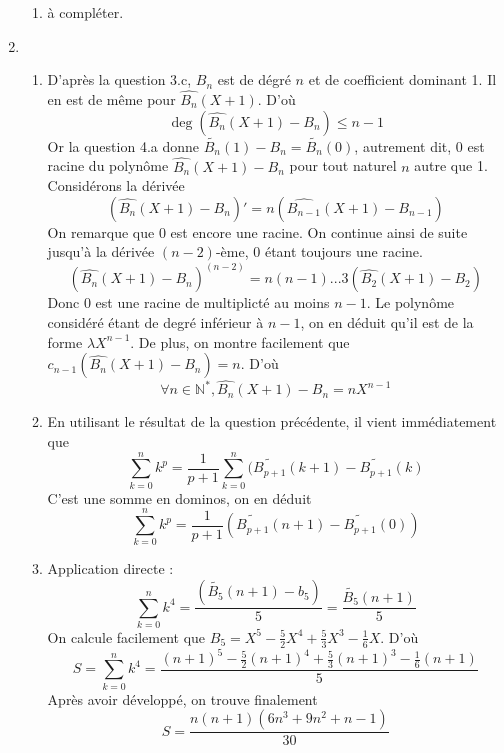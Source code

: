 \begin{enumerate}
\begin{enumerate}
\item à compléter.
\end{enumerate}
	
\item
\begin{enumerate}
\item D'après la question 3.c, $B_n$ est de dégré $n$ et de coefficient dominant 1. Il en est de même pour $\widehat{B_n}(X+1)$. D'où 
		\[\deg (\widehat{B_n}(X+1)-B_n)\leq n-1\]
Or la question 4.a donne $\widetilde{B_n}(1)-B_n=\widetilde{B_n}(0)$, autrement dit, 0 est racine du polynôme $\widehat{B_n}(X+1)-B_n$ pour tout naturel $n$ autre que 1.\newline 
Considérons la dérivée
		\[(\widehat{B_n}(X+1)-B_n)'=n(\widehat{B_{n-1}}(X+1)-B_{n-1})\]
On remarque que 0 est encore une racine. On continue ainsi de suite jusqu'à la dérivée $(n-2)$-ème, 0 étant toujours une racine.
		\[(\widehat{B_n}(X+1)-B_n)^{(n-2)}=n(n-1)...3(\widehat{B_{2}}(X+1)-B_{2})\]
Donc $0$ est une racine de multiplicté au moins $n-1$. Le polynôme considéré étant de degré inférieur à $n-1$, on en déduit qu'il est de la forme $\lambda X^{n-1}$. De plus, on montre facilement que $c_{n-1}(\widehat{B_n}(X+1)-B_n)=n$. D'où
		\[\forall n \in \mathbb{N}^{*}, \widehat{B_{n}}(X+1)-B_n=nX^{n-1}\]
		
\item En utilisant le résultat de la question précédente, il vient immédiatement que 
		\[\sum_{k=0}^nk^p=\frac{1}{p+1}\sum_{k=0}^n(\widetilde{B_{p+1}}(k+1)-\widetilde{B_{p+1}}(k)\]
C'est une somme en dominos, on en déduit
		\[\sum_{k=0}^nk^p=\frac{1}{p+1}(\widetilde{B_{p+1}}(n+1)-\widetilde{B_{p+1}}(0))\]
		
\item Application directe :
		\[\sum_{k=0}^nk^4=\frac{(\widetilde{B_{5}}(n+1)-b_5)}{5}=\frac{\widetilde{B_{5}}(n+1)}{5}\]
On calcule facilement que $B_5=X^5-\frac{5}{2}X^4+\frac{5}{3}X^3-\frac{1}{6}X$. D'où
		\[S=\sum_{k=0}^nk^4=\frac{(n+1)^5-\frac{5}{2}(n+1)^4+\frac{5}{3}(n+1)^3-\frac{1}{6}(n+1)}{5}\]
Après avoir développé, on trouve finalement
		\[S=\frac{n(n+1)(6n^3+9n^2+n-1)}{30}\]
	
\end{enumerate}
\end{enumerate}
